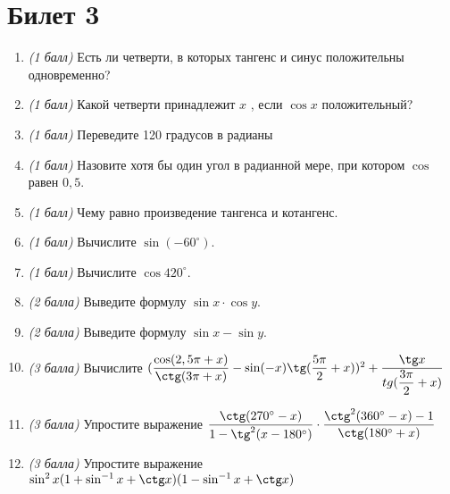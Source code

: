 \documentclass[12pt, a4paper]{article}
\begin{document}
	\section*{Билет 3}
	\begin{enumerate}
		\item \textit{(1 балл)}	Есть ли четверти, в которых тангенс и синус положительны одновременно? 
		\item \textit{(1 балл)}	Какой четверти принадлежит $x$ , если $\cos x$ положительный?
		\item \textit{(1 балл)}	Переведите 120 градусов в радианы
		\item \textit{(1 балл)}	Назовите хотя бы один угол в радианной мере, при котором $\cos$  равен $0,5$.
		\item \textit{(1 балл)} Чему равно произведение тангенса и котангенс.
		\item \textit{(1 балл)} Вычислите $\sin (-60^{\circ})$.
		\item \textit{(1 балл)}	Вычислите $\cos 420^{\circ}$.
		\item \textit{(2 балла)} Выведите формулу $\sin x \cdot \cos y$.
		\item \textit{(2 балла)} Выведите формулу $\sin x - \sin y$.
		\item \textit{(3 балла)} Вычислите $(\dfrac{\cos (2,5\pi + x)}{\ctg (3\pi + x)} - \sin (-x) \tg (\dfrac{5\pi}{2}+x))^2 + \dfrac{\tg x}{tg (\dfrac{3\pi}{2}+x)}$
		\item \textit{(3 балла)} Упростите выражение $\dfrac{\ctg(270^{\circ}-x)}{1-\tg^2(x-180^{\circ})} \cdot \dfrac{\ctg^2(360^{\circ}-x)-1}{\ctg(180^{\circ}+x)}$
		\item \textit{(3 балла)} Упростите выражение $\sin^2 x(1+\sin^{-1}x + \ctg x)(1 - \sin^{-1}x + \ctg x)$
	\end{enumerate}
\end{document}
